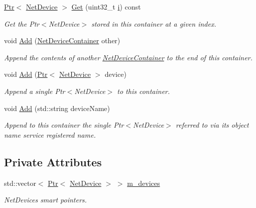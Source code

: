 \begin{DoxyCompactItemize}
\hyperlink{classns3_1_1Ptr}{Ptr}$<$ \hyperlink{classns3_1_1NetDevice}{Net\+Device} $>$ \hyperlink{classns3_1_1NetDeviceContainer_a677d62594b5c9d2dea155cc5045f4d0b}{Get} (uint32\+\_\+t \hyperlink{lte__uplink__power__control_8m_a6f6ccfcf58b31cb6412107d9d5281426}{i}) const 
\begin{DoxyCompactList}\small\item\em Get the Ptr$<$\+Net\+Device$>$ stored in this container at a given index. \end{DoxyCompactList}\item 
void \hyperlink{classns3_1_1NetDeviceContainer_a7ca8bc1d7ec00fd4fcc63869987fbda5}{Add} (\hyperlink{classns3_1_1NetDeviceContainer}{Net\+Device\+Container} other)
\begin{DoxyCompactList}\small\item\em Append the contents of another \hyperlink{classns3_1_1NetDeviceContainer}{Net\+Device\+Container} to the end of this container. \end{DoxyCompactList}\item 
void \hyperlink{classns3_1_1NetDeviceContainer_aa104faa5eb9785cdb6f15acc06d2b171}{Add} (\hyperlink{classns3_1_1Ptr}{Ptr}$<$ \hyperlink{classns3_1_1NetDevice}{Net\+Device} $>$ device)
\begin{DoxyCompactList}\small\item\em Append a single Ptr$<$\+Net\+Device$>$ to this container. \end{DoxyCompactList}\item 
void \hyperlink{classns3_1_1NetDeviceContainer_a285bc0aed3f760fd83bb7aef9ba39249}{Add} (std\+::string device\+Name)
\begin{DoxyCompactList}\small\item\em Append to this container the single Ptr$<$\+Net\+Device$>$ referred to via its object name service registered name. \end{DoxyCompactList}\end{DoxyCompactItemize}
\subsection*{Private Attributes}
\begin{DoxyCompactItemize}
\item 
std\+::vector$<$ \hyperlink{classns3_1_1Ptr}{Ptr}$<$ \hyperlink{classns3_1_1NetDevice}{Net\+Device} $>$ $>$ \hyperlink{classns3_1_1NetDeviceContainer_a843312c4f3c05e66de261e799e1a835f}{m\+\_\+devices}
\begin{DoxyCompactList}\small\item\em Net\+Devices smart pointers. \end{DoxyCompactList}\end{DoxyCompactItemize}


